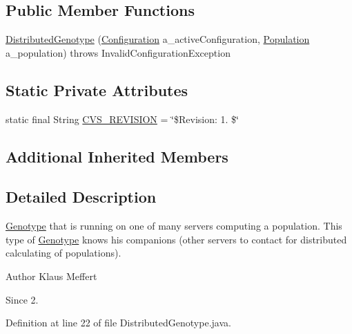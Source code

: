 \subsection*{Public Member Functions}
\begin{DoxyCompactItemize}
\item 
\hyperlink{classorg_1_1jgap_1_1distr_1_1_distributed_genotype_a285d8e6c7a4bbd04dc240dadd36fb474}{Distributed\-Genotype} (\hyperlink{classorg_1_1jgap_1_1_configuration}{Configuration} a\-\_\-active\-Configuration, \hyperlink{classorg_1_1jgap_1_1_population}{Population} a\-\_\-population)  throws Invalid\-Configuration\-Exception 
\end{DoxyCompactItemize}
\subsection*{Static Private Attributes}
\begin{DoxyCompactItemize}
\item 
static final String \hyperlink{classorg_1_1jgap_1_1distr_1_1_distributed_genotype_ad5f5a98fd1cf2cf2eade3cbe12dacff6}{C\-V\-S\-\_\-\-R\-E\-V\-I\-S\-I\-O\-N} = \char`\"{}\$Revision\-: 1. \$\char`\"{}
\end{DoxyCompactItemize}
\subsection*{Additional Inherited Members}


\subsection{Detailed Description}
\hyperlink{classorg_1_1jgap_1_1_genotype}{Genotype} that is running on one of many servers computing a population. This type of \hyperlink{classorg_1_1jgap_1_1_genotype}{Genotype} knows his companions (other servers to contact for distributed calculating of populations).

\begin{DoxyAuthor}{Author}
Klaus Meffert 
\end{DoxyAuthor}
\begin{DoxySince}{Since}
2. 
\end{DoxySince}


Definition at line 22 of file Distributed\-Genotype.\-java.



